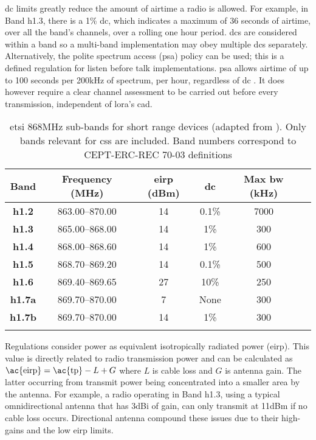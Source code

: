\ac{dc} limits greatly reduce the amount of airtime a radio is allowed. For example, in Band h1.3, there is a 1\% \ac{dc}, which indicates a maximum of 36 seconds of airtime, over all the band's channels, over a rolling one hour period. \ac{dc}s are considered within a band so a multi-band implementation may obey multiple \ac{dc}s separately. Alternatively, the polite spectrum access (\ac{psa}) policy can be used; this is a defined regulation for listen before talk implementations. \ac{psa} allows airtime of up to 100 seconds per 200kHz of spectrum, per hour, regardless of \ac{dc} \cite{3YP:ETSI_PSA}. It does however require a clear channel assessment to be carried out before every transmission, independent of \ac{lora}'s \ac{cad}.

\begin{table}[H]
\centering\small
\caption[\ac{etsi} 868MHz sub-band breakdown]{\ac{etsi} 868MHz sub-bands for short range devices (adapted from \cite{3YP:ETSI_HARMONISED_REG}). Only bands relevant for \ac{css} are included. Band numbers correspond to CEPT-ERC-REC 70-03 definitions \cite{3YP:CEPT_ERC_REC}}
\label{tab:ETSIBands}
\renewcommand*{\arraystretch}{1.1}
\begin{tabular}{c|ccccc}
    \toprule
    \textbf{Band} & \textbf{Frequency} (MHz) & \textbf{\ac{eirp}} (dBm)  & \textbf{\ac{dc}} & \textbf{Max \ac{bw}} (kHz) \\
    \midrule\addlinespace
    \textbf{h1.2} & 863.00--870.00 & 14 & 0.1\% & 7000 \\
    \textbf{h1.3} & 865.00--868.00 & 14 & 1\% & 300 \\
    \textbf{h1.4} & 868.00--868.60 & 14 & 1\% & 600 \\
    \textbf{h1.5} & 868.70--869.20 & 14 & 0.1\% & 500 \\
    \textbf{h1.6} & 869.40--869.65 & 27 & 10\% & 250 \\
    \textbf{h1.7a} & 869.70--870.00 & 7 & None & 300 \\
    \textbf{h1.7b} & 869.70--870.00 & 14 & 1\% & 300 \\   
    \addlinespace\bottomrule
\end{tabular}
\end{table}

Regulations consider power as equivalent isotropically radiated power (\ac{eirp}). This value is directly related to radio transmission power and can be calculated as $\text{\ac{eirp}} = \text{\ac{tp}} - L + G$ where $L$ is cable loss and $G$ is antenna gain. The latter occurring from transmit power being concentrated into a smaller area by the antenna. For example, a radio operating in Band h1.3, using a typical omnidirectional antenna that has 3dBi of gain, can only transmit at 11dBm if no cable loss occurs. Directional antenna compound these issues due to their high-gains and the low \ac{eirp} limits.

